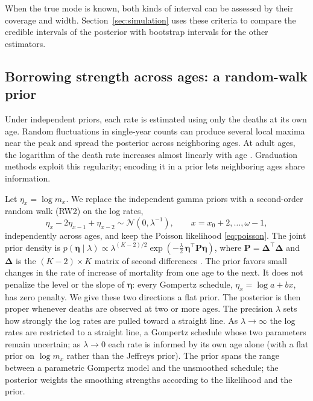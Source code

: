 \documentclass[12pt, letterpaper]{article}
\begin{document}
When the true mode is known, both kinds of interval can be assessed by their coverage and width. Section~\ref{sec:simulation} uses these criteria to compare the credible intervals of the posterior with bootstrap intervals for the other estimators.

\subsection{Borrowing strength across ages: a random-walk prior}
\label{sec:rw2}

Under independent priors, each rate is estimated using only the deaths at its own age. Random fluctuations in single-year counts can produce several local maxima near the peak and spread the posterior across neighboring ages. At adult ages, the logarithm of the death rate increases almost linearly with age \citep{gompertz1825nature, missov2015gompertz}. Graduation methods exploit this regularity; encoding it in a prior lets neighboring ages share information.

Let $\eta_x = \log m_x$. We replace the independent gamma priors with a second-order random walk (RW2) on the log rates,
\begin{equation}
\eta_x - 2\eta_{x-1} + \eta_{x-2} \sim \mathcal{N}(0, \lambda^{-1}), \qquad x = x_0 + 2, \dots, \omega - 1,
\label{eq:rw2}
\end{equation}
independently across ages, and keep the Poisson likelihood \eqref{eq:poisson}. The joint prior density is $p(\bm{\eta} \mid \lambda) \propto \lambda^{(K-2)/2} \exp(-\tfrac{\lambda}{2}\, \bm{\eta}^\top \bm{P} \bm{\eta})$, where $\bm{P} = \bm{\Delta}^\top \bm{\Delta}$ and $\bm{\Delta}$ is the $(K-2) \times K$ matrix of second differences \citep{rue2005gaussian}. The prior favors small changes in the rate of increase of mortality from one age to the next. It does not penalize the level or the slope of $\bm{\eta}$: every Gompertz schedule, $\eta_x = \log a + bx$, has zero penalty. We give these two directions a flat prior. The posterior is then proper whenever deaths are observed at two or more ages. The precision $\lambda$ sets how strongly the log rates are pulled toward a straight line. As $\lambda \to \infty$ the log rates are restricted to a straight line, a Gompertz schedule whose two parameters remain uncertain; as $\lambda \to 0$ each rate is informed by its own age alone (with a flat prior on $\log m_x$ rather than the Jeffreys prior). The prior spans the range between a parametric Gompertz model and the unsmoothed schedule; the posterior weights the smoothing strengths according to the likelihood and the prior.
\end{document}
